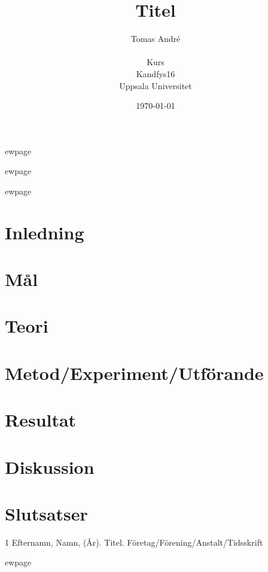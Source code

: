\documentclass[11pt]{article}
\title{\textbf{Titel}}
\author{Tomas André\\\\Kurs\\Kandfys16\\ Uppsala Universitet}
\date{\today}
\begin{document}
\maketitle 



ewpage
\begin{otherlanguage}{english}
\begin{abstract}
\end{abstract}
\end{otherlanguage}

ewpage
\tableofcontents

ewpage

\section{Inledning}

\section{Mål}

\section{Teori}

\section{Metod/Experiment/Utförande}

\section{Resultat}

\section{Diskussion}

\section{Slutsatser}

\begin{thebibliography}{1}
 Efternamn, Namn, (År). Titel. Företag/Förening/Anstalt/Tidsskrift
\end{thebibliography} 

ewpage
\appendix
\end{document}
